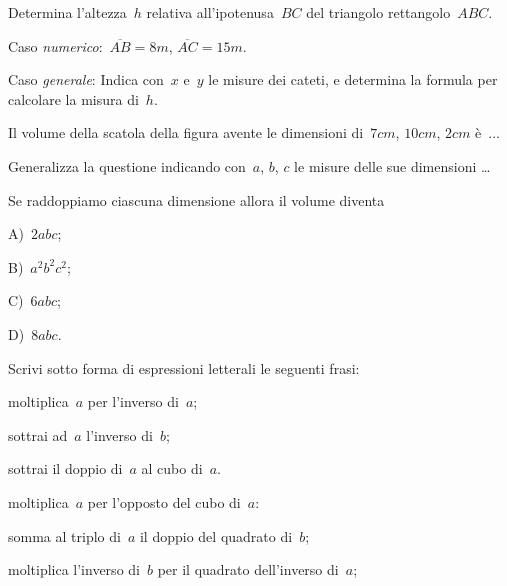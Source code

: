 \begin{esercizio}
\label{ese:9.7} %
Determina l'altezza~$h$ relativa all'ipotenusa~$BC$ del triangolo rettangolo~$ABC$.

Caso \emph{numerico}:~$\overline{AB}=8\unit{m}$, $\overline{AC}=15\unit{m}.$

Caso \emph{generale}: Indica con~$x$ e~$y$ le misure dei cateti, e determina la formula per calcolare la misura di~$h$.
\end{esercizio}

\begin{esercizio}
\label{ese:9.8} %
\begin{multicols}{2}
Il volume della scatola della figura %
avente le dimensioni di~$7\unit{cm}$, $10\unit{cm}$, $2\unit{cm}$ è~$\ldots$

Generalizza la questione indicando con~$a$, $b$, $c$ le misure delle sue dimensioni \ldots

Se raddoppiamo ciascuna dimensione allora il volume diventa

 A)~$2abc$;

 B)~$a^{2}b^{2}c^{2}$;

 C)~$6abc$;

 D)~$8abc$.
\begin{center}

\end{center}
\end{multicols}
\end{esercizio}

\begin{esercizio}[\Ast]
\label{ese:9.9} %
Scrivi sotto forma di espressioni letterali le seguenti frasi:
 \begin{enumeratea}
 \item moltiplica~$a$ per l'inverso di~$a$;
 \item sottrai ad~$a$ l'inverso di~$b$;
 \item sottrai il doppio di~$a$ al cubo di~$a$.
 \item moltiplica~$a$ per l'opposto del cubo di~$a$:
 \item somma al triplo di~$a$ il doppio del quadrato di~$b$;
 \item moltiplica l'inverso di~$b$ per il quadrato dell'inverso di~$a$;
 \end{enumeratea}
\end{esercizio}

